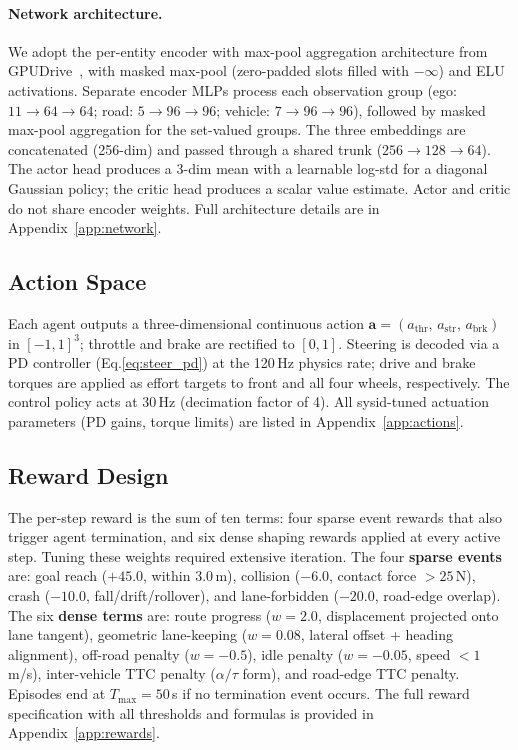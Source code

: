 \paragraph{Network architecture.}
We adopt the per-entity encoder with max-pool aggregation architecture from GPUDrive~\cite{kazemkhani_gpudrive_2025}, with masked max-pool (zero-padded slots filled with $-\infty$) and ELU activations.
Separate encoder MLPs process each observation group (ego: $11{\to}64{\to}64$; road: $5{\to}96{\to}96$; vehicle: $7{\to}96{\to}96$), followed by masked max-pool aggregation for the set-valued groups.
The three embeddings are concatenated (256-dim) and passed through a shared trunk ($256{\to}128{\to}64$).
The actor head produces a 3-dim mean with a learnable log-std for a diagonal Gaussian policy; the critic head produces a scalar value estimate.
Actor and critic do not share encoder weights.
Full architecture details are in Appendix~\ref{app:network}.


\subsection{Action Space}
\label{sec:actions}

Each agent outputs a three-dimensional continuous action $\mathbf{a} = (a_{\mathrm{thr}},\, a_{\mathrm{str}},\, a_{\mathrm{brk}})$ in $[-1,1]^3$; throttle and brake are rectified to $[0,1]$.
Steering is decoded via a PD controller (Eq.\ref{eq:steer_pd}) at the 120\,Hz physics rate; drive and brake torques are applied as effort targets to front and all four wheels, respectively.
The control policy acts at 30\,Hz (decimation factor of 4).
All sysid-tuned actuation parameters (PD gains, torque limits) are listed in Appendix~\ref{app:actions}.


\subsection{Reward Design}
\label{sec:rewards}

The per-step reward is the sum of ten terms: four sparse event rewards that also trigger agent termination, and six dense shaping rewards applied at every active step.
Tuning these weights required extensive iteration.
The four \textbf{sparse events} are: goal reach ($+45.0$, within 3.0\,m), collision ($-6.0$, contact force $> 25$\,N), crash ($-10.0$, fall/drift/rollover), and lane-forbidden ($-20.0$, road-edge overlap).
The six \textbf{dense terms} are: route progress ($w{=}2.0$, displacement projected onto lane tangent), geometric lane-keeping ($w{=}0.08$, lateral offset + heading alignment), off-road penalty ($w{=}{-}0.5$), idle penalty ($w{=}{-}0.05$, speed $< 1$\,m/s), inter-vehicle TTC penalty ($\alpha/\tau$ form), and road-edge TTC penalty.
Episodes end at $T_{\mathrm{max}} = 50$\,s if no termination event occurs.
The full reward specification with all thresholds and formulas is provided in Appendix~\ref{app:rewards}.


